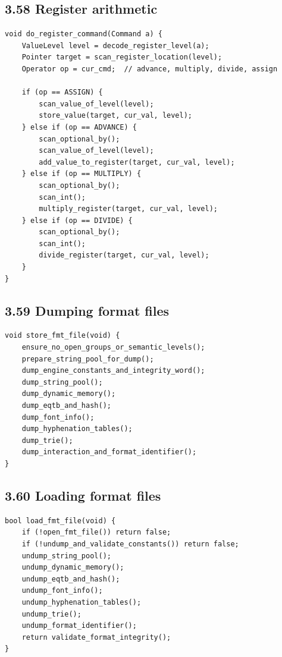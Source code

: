 \documentclass[11pt]{article}
\begin{document}
\subsection{3.58 Register arithmetic}\label{register-arithmetic}

\begin{verbatim}
void do_register_command(Command a) {
    ValueLevel level = decode_register_level(a);
    Pointer target = scan_register_location(level);
    Operator op = cur_cmd;  // advance, multiply, divide, assign

    if (op == ASSIGN) {
        scan_value_of_level(level);
        store_value(target, cur_val, level);
    } else if (op == ADVANCE) {
        scan_optional_by();
        scan_value_of_level(level);
        add_value_to_register(target, cur_val, level);
    } else if (op == MULTIPLY) {
        scan_optional_by();
        scan_int();
        multiply_register(target, cur_val, level);
    } else if (op == DIVIDE) {
        scan_optional_by();
        scan_int();
        divide_register(target, cur_val, level);
    }
}
\end{verbatim}

\subsection{3.59 Dumping format files}\label{dumping-format-files}

\begin{verbatim}
void store_fmt_file(void) {
    ensure_no_open_groups_or_semantic_levels();
    prepare_string_pool_for_dump();
    dump_engine_constants_and_integrity_word();
    dump_string_pool();
    dump_dynamic_memory();
    dump_eqtb_and_hash();
    dump_font_info();
    dump_hyphenation_tables();
    dump_trie();
    dump_interaction_and_format_identifier();
}
\end{verbatim}

\subsection{3.60 Loading format files}\label{loading-format-files}

\begin{verbatim}
bool load_fmt_file(void) {
    if (!open_fmt_file()) return false;
    if (!undump_and_validate_constants()) return false;
    undump_string_pool();
    undump_dynamic_memory();
    undump_eqtb_and_hash();
    undump_font_info();
    undump_hyphenation_tables();
    undump_trie();
    undump_format_identifier();
    return validate_format_integrity();
}
\end{verbatim}
\end{document}
